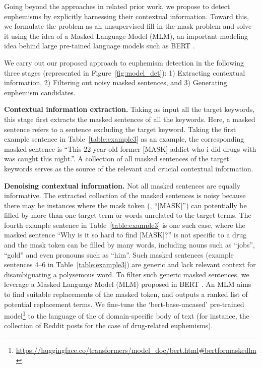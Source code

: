 Going beyond the approaches in related prior work, we propose to detect euphemisms by explicitly harnessing their contextual information. Toward this, we formulate the problem as an unsupervised fill-in-the-mask problem and solve it using the idea of a Masked Language Model (MLM), an important modeling idea behind large pre-tained language models such as BERT \cite{devlin2019bert}. 

We carry out our proposed approach to euphemism detection in the following three stages (represented  in Figure~\ref{fig:model_det}): 
1) Extracting contextual information, 
2) Filtering out noisy masked sentences, and 
3) Generating euphemism candidates.  

\noindent\textbf{Contextual information extraction.} Taking as input all the target keywords, this stage first extracts the masked sentences of all the keywords. 
Here, a masked sentence refers to a sentence excluding the target keyword. 
Taking the first example sentence in Table~\ref{table:example3} as an example, the corresponding masked sentence is ``This 22 year old former [MASK] addict who i did drugs with was caught this night.''. 
A collection of all  masked sentences of the target keywords serves as the source of the relevant and crucial contextual information. 

\noindent\textbf{Denoising contextual information.} Not all masked sentences are equally informative. 
The extracted collection of the masked sentences is noisy because there may be  instances where the mask token (\ie, ``[MASK]'') can potentially be filled by more than one target term or words unrelated to the target terms. 
The fourth example sentence 
in Table~\ref{table:example3} is one such case, where the masked sentence ``Why is it so hard to find [MASK]?'' is not specific to a drug and the mask token can be filled  by many words, including nouns such as ``jobs'', ``gold'' and even pronouns such as ``him''. 
Such masked sentences (example sentences 4--6 
in Table~\ref{table:example3}) are generic and lack relevant  context for disambiguating a polysemous word. 
To filter such generic masked sentences, we leverage a Masked Language Model (MLM) proposed in BERT \cite{devlin2019bert}. 
An MLM aims to find suitable replacements of the masked token, and outputs a ranked list of potential replacement terms.  We fine-tune the `bert-base-uncased' pre-trained model\footnote{ \url{https://huggingface.co/transformers/model\_doc/bert.html\#bertformaskedlm}} to the language of the  of domain-specific body of text (for instance,  the collection of Reddit posts for the case of drug-related euphemisms).


